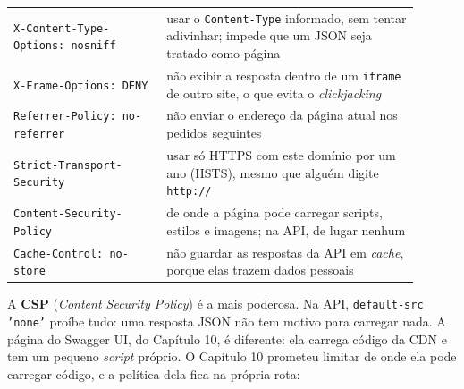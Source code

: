 \begin{center}
\begin{tabular}{@{}P{0.34\linewidth}P{0.56\linewidth}@{}}
\toprule
{}
 &  \\
\midrule
\texttt{X-Content-Type-Options: nosniff} & usar o \texttt{Content-Type} informado, sem tentar adivinhar; impede que um JSON seja tratado como página \\
 \texttt{X-Frame-Options: DENY} & não exibir a resposta dentro de um \texttt{iframe} de outro site, o que evita o \textit{clickjacking} \\
\texttt{Referrer-Policy: no-referrer} & não enviar o endereço da página atual nos pedidos seguintes \\
 \texttt{Strict-Transport-Security} & usar só HTTPS com este domínio por um ano (HSTS), mesmo que alguém digite \texttt{http://} \\
\texttt{Content-Security-Policy} & de onde a página pode carregar scripts, estilos e imagens; na API, de lugar nenhum \\
 \texttt{Cache-Control: no-store} & não guardar as respostas da API em \textit{cache}, porque elas trazem dados pessoais \\
\bottomrule
\end{tabular}
\end{center}

A \textbf{CSP} (\textit{Content Security Policy}) é a mais poderosa. Na API, \texttt{default-src 'none'} proíbe tudo: uma resposta JSON não tem motivo para carregar nada. A página do Swagger UI, do Capítulo 10, é diferente: ela carrega código da CDN e tem um pequeno \textit{script} próprio. O Capítulo 10 prometeu limitar de onde ela pode carregar código, e a política dela fica na própria rota:

